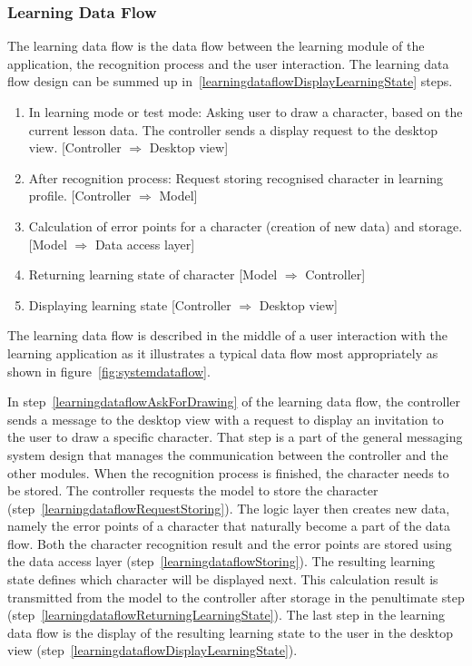\subsubsection{Learning Data Flow}
\label{sec:arch:learningdataflow}

The learning data flow is the data flow between the learning module of the 
application, the recognition process and the user interaction.
The learning data flow design can be summed up 
in~\ref{learningdataflowDisplayLearningState} steps.
\begin{enumerate}
  \item \label{learningdataflowAskForDrawing} 
        In learning mode or test mode: Asking user to draw a character,
        based on the current lesson data. The controller sends a display
        request to the desktop view.
        [Controller $\Rightarrow$ Desktop view]
  \item \label{learningdataflowRequestStoring} 
        After recognition process: Request storing recognised character in 
        learning profile.
        [Controller $\Rightarrow$ Model]
  \item \label{learningdataflowStoring} 
        Calculation of error points for a character (creation of new data) and
        storage.
        [Model $\Rightarrow$ Data access layer]
  \item \label{learningdataflowReturningLearningState} 
        Returning learning state of character 
        [Model $\Rightarrow$ Controller] 
  \item \label{learningdataflowDisplayLearningState} %
        Displaying learning state 
        [Controller $\Rightarrow$ Desktop view]
\end{enumerate}
The learning data flow is described in the middle of a user interaction with the
learning application as it illustrates a typical data flow most appropriately
as shown in figure~\ref{fig:systemdataflow}.

In step~\ref{learningdataflowAskForDrawing} of the learning data flow, the 
controller sends a message to the desktop view with a request to display an 
invitation to the user to draw a specific character.
That step is a part of the general messaging system design that manages the 
communication between the controller and the other modules.
When the recognition process is finished, the character needs to be stored.
The controller requests the model to store the 
character (step~\ref{learningdataflowRequestStoring}).
The logic layer then creates new data, namely the error points of a 
character that naturally become a part of the data flow.
Both the character recognition result and the error points are stored
using the data access layer (step~\ref{learningdataflowStoring}). 
The resulting learning state defines which character will be displayed next.
This calculation result is transmitted from the model to the 
controller after storage in the penultimate 
step (step~\ref{learningdataflowReturningLearningState}).
The last step in the learning data flow is the display of the resulting 
learning state to the user in the desktop 
view (step~\ref{learningdataflowDisplayLearningState}).

